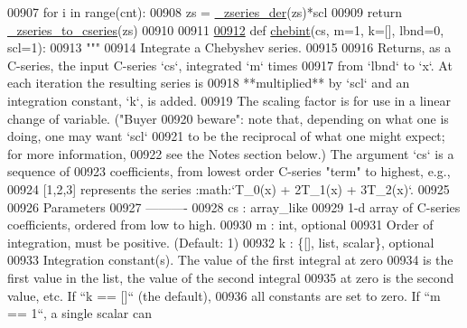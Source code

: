 \begin{DoxyCode}
00907         \textcolor{keywordflow}{for} i \textcolor{keywordflow}{in} range(cnt):
00908             zs = \hyperlink{namespacepyneb_1_1utils_1_1chebyshev_adb39b6e9d3aba3bf3784a3364ec3e6ca}{\_zseries\_der}(zs)*scl
00909         \textcolor{keywordflow}{return} \hyperlink{namespacepyneb_1_1utils_1_1chebyshev_a2a88474ce0ea12fb26f82b7116752dc1}{\_zseries\_to\_cseries}(zs)
00910 
00911 
\hypertarget{chebyshev_8py_source_l00912}{}\hyperlink{namespacepyneb_1_1utils_1_1chebyshev_a233e686a07b9935c74ce1e053f0c5f5f}{00912} \textcolor{keyword}{def }\hyperlink{namespacepyneb_1_1utils_1_1chebyshev_a233e686a07b9935c74ce1e053f0c5f5f}{chebint}(cs, m=1, k=[], lbnd=0, scl=1):
00913     \textcolor{stringliteral}{"""}
00914 \textcolor{stringliteral}{    Integrate a Chebyshev series.}
00915 \textcolor{stringliteral}{}
00916 \textcolor{stringliteral}{    Returns, as a C-series, the input C-series `cs`, integrated `m` times}
00917 \textcolor{stringliteral}{    from `lbnd` to `x`.  At each iteration the resulting series is}
00918 \textcolor{stringliteral}{    **multiplied** by `scl` and an integration constant, `k`, is added.}
00919 \textcolor{stringliteral}{    The scaling factor is for use in a linear change of variable.  ("Buyer}
00920 \textcolor{stringliteral}{    beware": note that, depending on what one is doing, one may want `scl`}
00921 \textcolor{stringliteral}{    to be the reciprocal of what one might expect; for more information,}
00922 \textcolor{stringliteral}{    see the Notes section below.)  The argument `cs` is a sequence of}
00923 \textcolor{stringliteral}{    coefficients, from lowest order C-series "term" to highest, e.g.,}
00924 \textcolor{stringliteral}{    [1,2,3] represents the series :math:`T\_0(x) + 2T\_1(x) + 3T\_2(x)`.}
00925 \textcolor{stringliteral}{}
00926 \textcolor{stringliteral}{    Parameters}
00927 \textcolor{stringliteral}{    ----------}
00928 \textcolor{stringliteral}{    cs : array\_like}
00929 \textcolor{stringliteral}{        1-d array of C-series coefficients, ordered from low to high.}
00930 \textcolor{stringliteral}{    m : int, optional}
00931 \textcolor{stringliteral}{        Order of integration, must be positive. (Default: 1)}
00932 \textcolor{stringliteral}{    k : \{[], list, scalar\}, optional}
00933 \textcolor{stringliteral}{        Integration constant(s).  The value of the first integral at zero}
00934 \textcolor{stringliteral}{        is the first value in the list, the value of the second integral}
00935 \textcolor{stringliteral}{        at zero is the second value, etc.  If ``k == []`` (the default),}
00936 \textcolor{stringliteral}{        all constants are set to zero.  If ``m == 1``, a single scalar can}

\end{DoxyCode}
